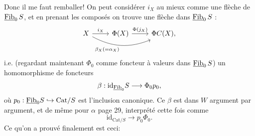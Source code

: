 Donc il me faut remballer! On peut considérer $i_X$ au mieux comme une flèche de $\underline{\mathrm{Fib}}_0\, S$, et en prenant les composés on trouve une flèche dans $\underline{\mathrm{Fib}}_0\, S$ :
\[
\begin{tikzcd}
X \arrow[r, "i_X"] \arrow[rr, bend right=25, "\beta_X(=\alpha_X)"'] & \Phi(X) \arrow[r, "\Phi(j_X)"] & \Phi C(X),
\end{tikzcd}
\]
i.e. (regardant maintenant $\Phi_0$ comme foncteur à valeurs dans $\underline{\mathrm{Fib}}_0\, S$) un homomorphisme de foncteurs
\[
\beta : \mathrm{id}_{\uu{Fib}_0} S \longrightarrow \Phi_0 p_0, %
\]
où $p_0 : \underline{\mathrm{Fib}}_0 S \hookrightarrow \mathrm{Cat}/S$ est l'inclusion canonique. Ce $\beta$ est dans $W$ argument par argument, et de même pour $\alpha$ page 29, interprété cette fois comme
\[
\mathrm{id}_{\mathrm{Cat}/S} \longrightarrow p_0\Phi_0.
\]
Ce qu'on a prouvé finalement est ceci:

